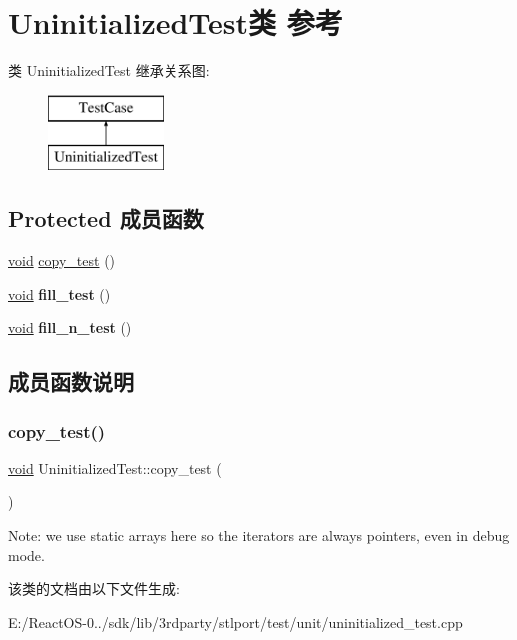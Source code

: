 \hypertarget{class_uninitialized_test}{}\section{Uninitialized\+Test类 参考}
\label{class_uninitialized_test}
类 Uninitialized\+Test 继承关系图\+:\begin{figure}[H]
\begin{center}
\leavevmode
\includegraphics[height=2.000000cm]{class_uninitialized_test}
\end{center}
\end{figure}
\subsection*{Protected 成员函数}
\begin{DoxyCompactItemize}
\item 
\hyperlink{interfacevoid}{void} \hyperlink{class_uninitialized_test_a57257584b398793d281af64e64b98148}{copy\+\_\+test} ()
\item 
\mbox{\label{class_uninitialized_test_ad98aa0fa389c4838180d20d524585a4d}} 
\hyperlink{interfacevoid}{void} {\bfseries fill\+\_\+test} ()
\item 
\mbox{\label{class_uninitialized_test_a1655b079cdd1f8b0faba0bd026453d0c}} 
\hyperlink{interfacevoid}{void} {\bfseries fill\+\_\+n\+\_\+test} ()
\end{DoxyCompactItemize}


\subsection{成员函数说明}
\mbox{\label{class_uninitialized_test_a57257584b398793d281af64e64b98148}} 
\subsubsection{\texorpdfstring{copy\+\_\+test()}{copy\_test()}}
{\footnotesize\ttfamily \hyperlink{interfacevoid}{void} Uninitialized\+Test\+::copy\+\_\+test (\begin{DoxyParamCaption}{ }\end{DoxyParamCaption})\hspace{0.3cm}{\ttfamily [protected]}}

Note\+: we use static arrays here so the iterators are always pointers, even in debug mode. 

该类的文档由以下文件生成\+:\begin{DoxyCompactItemize}
\item 
E\+:/\+React\+O\+S-\/0../sdk/lib/3rdparty/stlport/test/unit/uninitialized\+\_\+test.\+cpp\end{DoxyCompactItemize}
